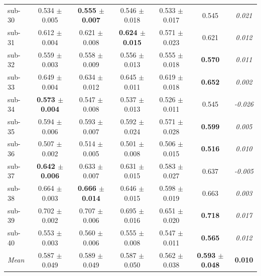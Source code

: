 \begin{table}[t]
\begin{tabular}{lcccccc}
sub-30 & 0.534 $\pm$ 0.005 & \textbf{0.555 $\pm$ 0.007} & 0.546 $\pm$ 0.018 & 0.533 $\pm$ 0.017 & 0.545 & \textit{0.021} \\
sub-31 & 0.612 $\pm$ 0.004 & 0.621 $\pm$ 0.008 & \textbf{0.624 $\pm$ 0.015} & 0.571 $\pm$ 0.023 & 0.621 & \textit{0.012} \\
sub-32 & 0.559 $\pm$ 0.003 & 0.558 $\pm$ 0.009 & 0.556 $\pm$ 0.013 & 0.555 $\pm$ 0.018 & \textbf{0.570} & \textit{0.011} \\
sub-33 & 0.649 $\pm$ 0.004 & 0.634 $\pm$ 0.012 & 0.645 $\pm$ 0.011 & 0.619 $\pm$ 0.018 & \textbf{0.652} & \textit{0.002} \\
sub-34 & \textbf{0.573 $\pm$ 0.004} & 0.547 $\pm$ 0.008 & 0.537 $\pm$ 0.013 & 0.526 $\pm$ 0.011 & 0.545 & \textit{-0.026} \\
sub-35 & 0.594 $\pm$ 0.006 & 0.593 $\pm$ 0.007 & 0.592 $\pm$ 0.024 & 0.571 $\pm$ 0.028 & \textbf{0.599} & \textit{0.005} \\
sub-36 & 0.507 $\pm$ 0.002 & 0.514 $\pm$ 0.005 & 0.501 $\pm$ 0.008 & 0.506 $\pm$ 0.015 & \textbf{0.516} & \textit{0.010} \\
sub-37 & \textbf{0.642 $\pm$ 0.006} & 0.633 $\pm$ 0.007 & 0.631 $\pm$ 0.015 & 0.583 $\pm$ 0.027 & 0.637 & \textit{-0.005} \\
sub-38 & 0.664 $\pm$ 0.003 & \textbf{0.666 $\pm$ 0.014} & 0.646 $\pm$ 0.015 & 0.598 $\pm$ 0.019 & 0.663 & \textit{0.003} \\
sub-39 & 0.702 $\pm$ 0.002 & 0.707 $\pm$ 0.006 & 0.695 $\pm$ 0.016 & 0.651 $\pm$ 0.020 & \textbf{0.718} & \textit{0.017} \\
sub-40 & 0.553 $\pm$ 0.003 & 0.560 $\pm$ 0.006 & 0.555 $\pm$ 0.008 & 0.547 $\pm$ 0.011 & \textbf{0.565} & \textit{0.012} \\
\midrule
\textit{Mean} & 0.587 $\pm$ 0.049 & 0.589 $\pm$ 0.049 & 0.587 $\pm$ 0.050 & 0.562 $\pm$ 0.038 & \textbf{0.593 $\pm$ 0.048} & \textbf{0.010} \\
\bottomrule
\end{tabular}
\end{table}

